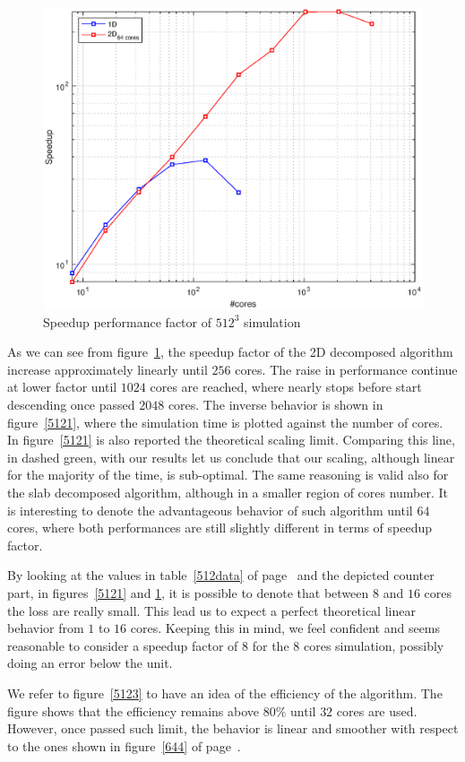 \begin{figure}
\begin{center}
\includegraphics[scale=0.6]{grafici/5122}
\caption{Speedup performance factor of $512^3$ simulation}
\label{5122}
\end{center}
\end{figure}

As we can see from figure~\ref{5122}, the speedup factor of the 2D decomposed algorithm increase approximately linearly until $256$ cores. The raise in performance continue at lower factor until $1024$ cores are reached, where nearly stops before start descending once passed $2048$ cores.
The inverse behavior is shown in figure~\ref{5121}, where the simulation time is plotted against the number of cores.\\
In figure~\ref{5121} is also reported the theoretical scaling limit. Comparing this line, in dashed green, with our results let us conclude that our scaling, although linear for the majority of the time, is sub-optimal. 
The same reasoning is valid also for the slab decomposed algorithm, although in a smaller region of cores number.
It is interesting to denote the advantageous behavior of such algorithm until $64$ cores, where both performances are still slightly different in terms of speedup factor. 
\par
By looking at the values in table~\ref{512data} of page~\pageref{512data} and the depicted counter part, in figures~\ref{5121} and \ref{5122}, it is possible to denote that between $8$ and $16$ cores the loss are really small. This lead us to expect a perfect theoretical linear behavior from $1$ to $16$ cores. Keeping this in mind, we feel confident and seems reasonable to consider a speedup factor of $8$ for the $8$ cores simulation, possibly doing an error below the unit. \\
\par
We refer to figure~\ref{5123} to have an idea of the efficiency of the algorithm. The figure shows that the efficiency remains above $80\%$ until $32$ cores are used. However, once passed such limit, the behavior is linear and smoother with respect to the ones shown in figure~\ref{644} of page~\pageref{644}.

